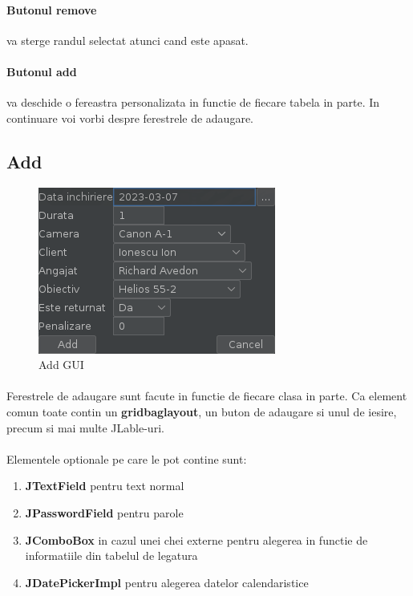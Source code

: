 \documentclass[oneside]{article}
\begin{document}
\paragraph{Butonul remove} va sterge randul selectat atunci cand este apasat.

\paragraph{Butonul add} va deschide o fereastra personalizata in functie de fiecare tabela in parte. In continuare voi vorbi despre ferestrele de adaugare.

\subsection[Add]{Add}
\begin{figure}[ht]
    \centering
    \noindent\includegraphics[scale=0.6]{addgui.png}
    \caption{Add GUI}
    \label{fig:addgui}
\end{figure}

\paragraph{} Ferestrele de adaugare sunt facute in functie de fiecare clasa in parte. Ca element comun toate contin un \textbf{gridbaglayout}, un buton de adaugare si unul de iesire, precum si mai multe JLable-uri.

\paragraph{} Elementele optionale pe care le pot contine sunt:
\begin{enumerate}
    \item \textbf{JTextField} pentru text normal
    \item \textbf{JPasswordField} pentru parole
    \item \textbf{JComboBox} in cazul unei chei externe pentru alegerea in functie de informatiile din tabelul de legatura
    \item \textbf{JDatePickerImpl} pentru alegerea datelor calendaristice
\end{enumerate}
\end{document}
